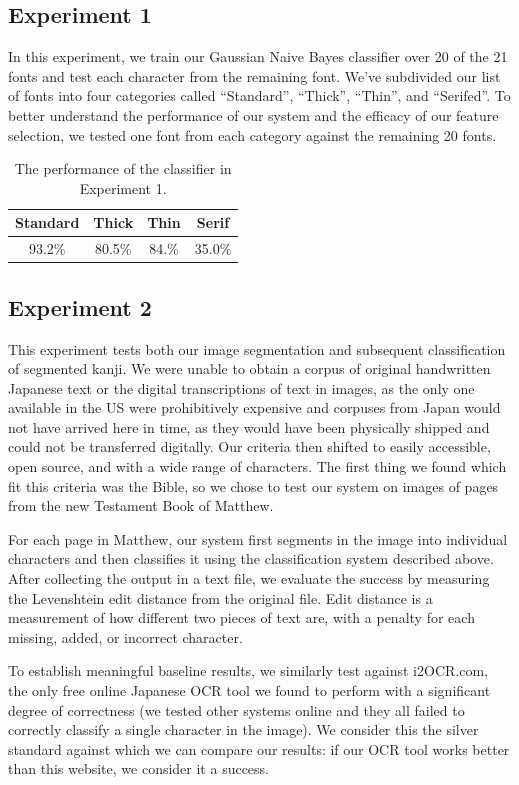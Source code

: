 \documentclass[10pt,twocolumn,letterpaper]{article}
\begin{document}
\subsection{Experiment 1}
In this experiment, we train our Gaussian Naive Bayes classifier over 20 of the 21 fonts and test each character from the remaining font. We’ve subdivided our list of fonts into four categories called  “Standard”, “Thick”, “Thin”, and “Serifed”. To better understand the performance of our system and the efficacy of our feature selection, we tested one font from each category against the remaining 20 fonts.

\begin{table}
    \centering
    \begin{tabular}{|c|c|c|c|}
        \hline
        Standard & Thick & Thin & Serif \\
        \hline
        93.2\% & 80.5\% & 84.\% & 35.0\%\\
        \hline
    \end{tabular}
    \caption{The performance of the classifier in Experiment 1.}
\end{table}

\subsection{Experiment 2}
This experiment tests both our image segmentation and subsequent classification of segmented kanji. We were unable to obtain a corpus of original handwritten Japanese text or the digital transcriptions of text in images, as the only one available in the US were prohibitively expensive and corpuses from Japan would not have arrived here in time, as they would have been physically shipped and could not be transferred digitally. Our criteria then shifted to easily accessible, open source, and with a wide range of characters. The first thing we found which fit this criteria was the Bible, so we chose to test our system on images of pages from the new Testament Book of Matthew.

For each page in Matthew, our system first segments in the image into individual characters and then classifies it using the classification system described above. After collecting the output in a text file, we evaluate the success by measuring the Levenshtein edit distance from the original file. Edit distance is a measurement of how different two pieces of text are, with a penalty for each missing, added, or incorrect character.

To establish meaningful baseline results, we similarly test against i2OCR.com, the only free online Japanese OCR tool we found to perform with a significant degree of correctness (we tested other systems online and they all failed to correctly classify a single character in the image). We consider this the silver standard against which we can compare our results: if our OCR tool works better than this website, we consider it a success.
\end{document}
